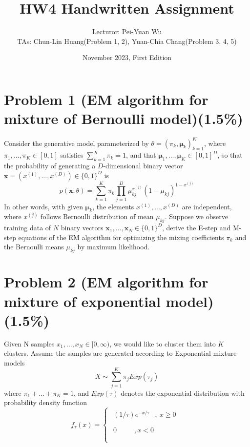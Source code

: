 \documentclass{article}
\title{HW4 Handwritten Assignment}
\author{Lecturor: Pei-Yuan Wu\\
TAs: {Chun-Lin Huang(Problem 1, 2), Yuan-Chia Chang(Problem 3, 4, 5)}}
\date{November 2023, First Edition}
\def\vecx{{\mathbf x}}
\def\vecmu{{\boldsymbol \mu}}
\begin{document}
\maketitle

\section*{Problem 1 (EM algorithm for mixture of Bernoulli model)(1.5\%)}
Consider the generative model parameterized by $\theta = (\pi_k,\vecmu_k)_{k=1}^K$, where $\pi_1,...,\pi_K \in [0,1]$ satisfies $\sum_{k=1}^K\pi_k = 1$, and that $\vecmu_1,...,\vecmu_K  \in [0,1]^D$, so that the probability of generating a $D$-dimensional binary vector $\vecx = (x^{(1)},...,x^{(D)}) \in \{0,1\}^D$ is
\begin{equation*}
p(\vecx; \theta) = \sum_{k=1}^K \pi_k \prod_{j=1}^D \mu_{kj}^{x^{(j)}}(1-\mu_{kj})^{1-x^{(j)}}
\end{equation*}
%
In other words, with given $\vecmu_k$, the elements $x^{(1)},...,x^{(D)}$ are independent, where $x^{(j)}$ follows Bernoulli distribution of mean $\mu_{kj}$.  Suppose we observe training data of $N$ binary vectors $\vecx_1,...,\vecx_N \in \{0,1\}^D$, derive the E-step and M-step equations of the EM algorithm for optimizing the mixing coefficients $\pi_k$ and the Bernoulli means $\mu_{kj}$ by maximum likelihood.

\section*{Problem 2 (EM algorithm for mixture of exponential model)(1.5\%)}
Given N samples \(x_{1},\ldots,x_{N} \in \lbrack 0,\infty)\), we would
like to cluster them into \(K\) clusters. Assume the samples are
generated according to Exponential mixture models
\[X\sim\sum_{j = 1}^{K}{\pi_{j}Exp(\tau_{j})}\]
where \(\pi_{1} + \ldots + \pi_{K} = 1\), and \(Exp(\tau)\) denotes the
exponential distribution with probability density function
\[f_{\tau}(x) = \left\{ \begin{matrix}
\begin{matrix}
(1/\tau)e^{- x/\tau} & ,\ x \geq 0 \\
\end{matrix} \\
\begin{matrix}
0\ \ \ \ \ \ \ \  & ,x < 0 \\
\end{matrix} \\
\end{matrix} \right.\ \]
\end{document}
